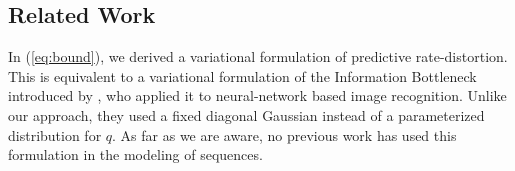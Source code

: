 \documentclass[11pt,letterpaper]{article}
\begin{document}
%
%
%
%
%
%
%
%





\subsection{Related Work}
In (\ref{eq:bound}), we derived a variational formulation of predictive rate-distortion.
This is equivalent to a variational formulation of the Information Bottleneck introduced by \cite{alemi-deep-2016}, who applied it to neural-network based image recognition.
Unlike our approach, they used a fixed diagonal Gaussian instead of a parameterized distribution for $q$.
As far as we are aware, no previous work has used this formulation in the modeling of sequences.
\end{document}
